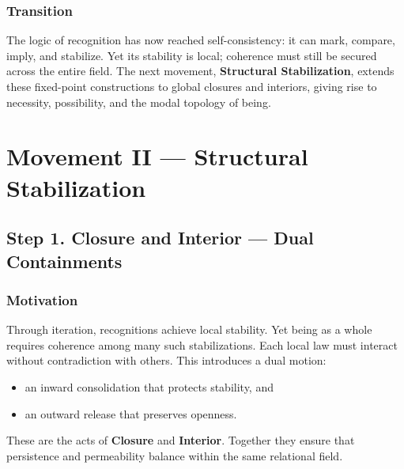 \documentclass[11pt]{article}
\begin{document}
\subsubsection*{Transition}
\label{sec:org3596511}
The logic of recognition has now reached self-consistency: it can mark, compare, imply, and stabilize.  
Yet its stability is local; coherence must still be secured across the entire field.  
The next movement, \textbf{Structural Stabilization}, extends these fixed-point constructions to global closures and interiors, giving rise to necessity, possibility, and the modal topology of being.
\section*{Movement II — Structural Stabilization}
\label{sec:org2ab337d}
\subsection*{Step 1. Closure and Interior — Dual Containments}
\label{sec:org8eb0963}

\subsubsection*{Motivation}
\label{sec:orge97939a}
Through iteration, recognitions achieve local stability.  
Yet being as a whole requires coherence among many such stabilizations.  
Each local law must interact without contradiction with others.  
This introduces a dual motion:  
\begin{itemize}
\item an inward consolidation that protects stability, and
\item an outward release that preserves openness.
\end{itemize}
These are the acts of \textbf{Closure} and \textbf{Interior}.  
Together they ensure that persistence and permeability balance within the same relational field.
\end{document}
